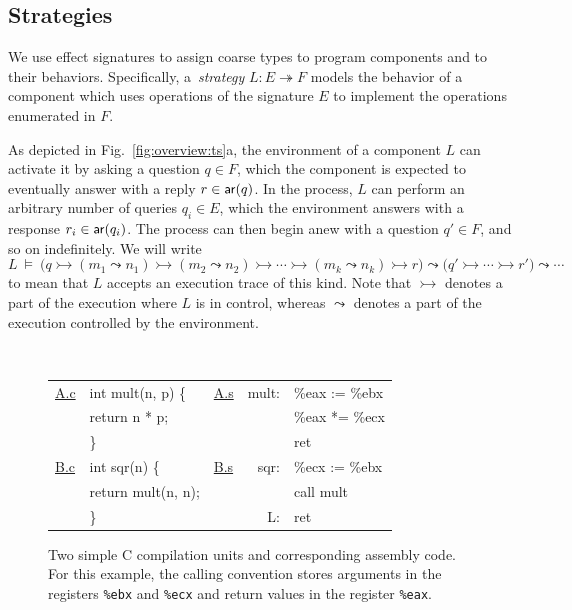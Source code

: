 
\subsection{Strategies} \label{sec:strat} %

We use effect signatures to assign coarse types
to program components and to their behaviors.
Specifically,
a~\emph{strategy} $L : E \twoheadrightarrow F$
models the behavior of a component which
uses operations of the signature $E$ to
implement the operations enumerated in $F$.

As depicted in Fig.~\ref{fig:overview:ts}a,
the environment of a component $L$ can activate it by asking a question $q \in F$,
which the component is expected to eventually answer
with a reply $r \in  \mathsf{ar} (q)$.
In the process,
$L$ can perform an arbitrary number of queries $q_i \in E$,
which the environment answers with a response $r_i \in  \mathsf{ar} (q_i)$.
The process can then begin anew with a question $q' \in F$,
and so on indefinitely.
We will write
\[
  L \:\vDash\: \big(q
    \rightarrowtail (m_1 \leadsto n_1)
    \rightarrowtail (m_2 \leadsto n_2)
    \rightarrowtail \cdots
    \rightarrowtail (m_k \leadsto n_k)
    \rightarrowtail r \big)
  \leadsto \big(q'
    \rightarrowtail \cdots
    \rightarrowtail r' \big)
  \leadsto \cdots
\]
to mean that $L$ accepts an execution trace of this kind.
Note that $\rightarrowtail$ denotes a part of the execution
where $L$ is in control,
whereas $\leadsto$ denotes a part of the execution
controlled by the environment.

\begin{figure} %
  \figsize
  \centering
  \tt
  {\footnotesize
  \begin{tabular}{ll lr@{\ }l}
    \hline
    \underline{A.c} & int mult(n, p) \{ &
    \underline{A.s} & mult: & \%eax := \%ebx \\
                    & \quad return n * p; &
                    & & \%eax *= \%ecx \\
                    & \} &
                    & & ret \\
    \hline
    \underline{B.c} & int sqr(n) \{ &
    \underline{B.s} & sqr: & \%ecx := \%ebx \\
                    & \quad return mult(n, n); &
                    & & call mult \\
                    & \} &
                    & L: & ret \\
    \hline
  \end{tabular}
  }
  \caption{Two simple C compilation units and corresponding assembly code.
    For this example,
    the calling convention stores arguments in
    the registers
    \texttt{\%ebx} and \texttt{\%ecx}
    and return values in
    the register
    \texttt{\%eax}.}
  \label{fig:abc}
\end{figure}

